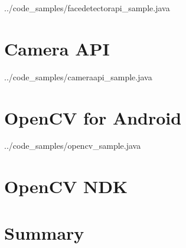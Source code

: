 
{../code_samples/facedetectorapi_sample.java}


\section{Camera API}


{../code_samples/cameraapi_sample.java}

\section{OpenCV for Android}


{../code_samples/opencv_sample.java}


\section{OpenCV NDK}

\section{Summary}

